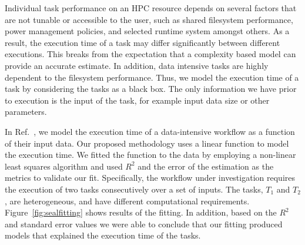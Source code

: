 Individual task performance on an HPC resource depends on several factors that are not tunable or accessible to the user, such as shared filesystem performance, power management policies, and selected runtime system amongst others. 
As a result, the execution time of a task may differ significantly between different executions. 
This breaks from the expectation that a complexity based model can provide an accurate estimate. 
In addition, data intensive tasks are highly dependent to the filesystem performance. 
Thus, we model the execution time of a task by considering the tasks as a black box. 
The only information we have prior to execution is the input of the task, for example input data size or other parameters.

In Ref.~\cite{paraskevakos2019workflow}, we model the execution time of a data-intensive workflow as a function of their input data. 
Our proposed methodology uses a linear function to model the execution time. 
We fitted the function to the data by employing a non-linear least squares algorithm and used $R^{2}$ and the error of the estimation as the metrics to validate our fit. 
Specifically, the workflow under investigation requires the execution of two tasks consecutively over a set of inputs. 
The tasks, $T_{1}$ and $T_{2}$, are heterogeneous, and have different computational requirements. 
Figure~\ref{fig:sealfitting} shows results of the fitting. 
In addition, based on the $R^{2}$ and standard error values we were able to conclude that our fitting produced models that explained the execution time of the tasks.

